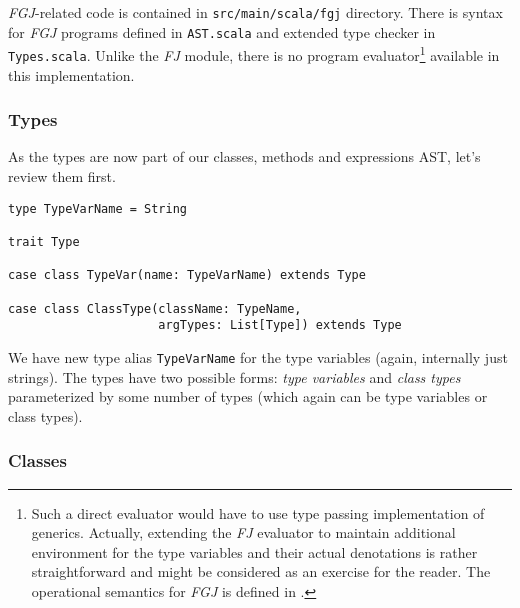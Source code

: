 \documentclass{article}[12pt]
\begin{document}
\emph{FGJ}-related code is contained in \texttt{src/main/scala/fgj}
directory. There is syntax for \emph{FGJ} programs defined in
\texttt{AST.scala} and extended type checker in \texttt{Types.scala}. 
Unlike the \emph{FJ} module, there is no program
evaluator\footnote{Such a direct evaluator would have to use type
passing implementation of generics. Actually, extending the \emph{FJ}
evaluator to maintain additional environment for the type variables
and their actual denotations is rather straightforward and might
be considered as an exercise for the reader. The operational
semantics for \emph{FGJ} is defined in \cite{fj}.} available
in this implementation.

\subsubsection{Types}

As the types are now part of our classes, methods and expressions
AST, let's review them first.

\begin{verbatim}
type TypeVarName = String

trait Type

case class TypeVar(name: TypeVarName) extends Type

case class ClassType(className: TypeName,
                     argTypes: List[Type]) extends Type
\end{verbatim}
We have new type alias \texttt{TypeVarName} for the type variables
(again, internally just strings). The types have two possible forms:
\emph{type variables} and \emph{class types} parameterized by
some number of types (which again can be type variables or
class types).

\subsubsection{Classes}
\end{document}

